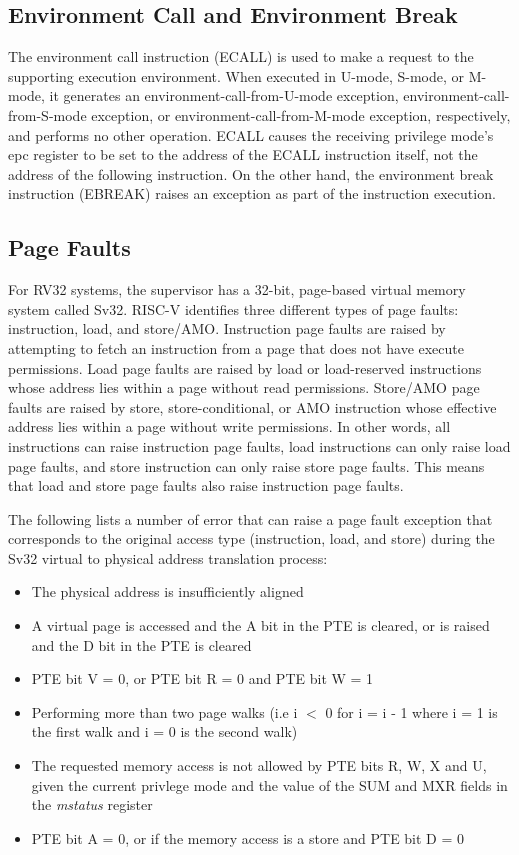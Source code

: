\documentclass[12pt]{article}
\begin{document}
\subsection{Environment Call and Environment Break}
The environment call instruction (ECALL) is used to make a request to the supporting execution environment. When executed in U-mode, S-mode, or M-mode, it generates an environment-call-from-U-mode exception, environment-call-from-S-mode exception, or environment-call-from-M-mode exception, respectively, and performs no other operation. ECALL causes the receiving privilege mode’s epc register to be set to the address of the ECALL instruction itself, not the address of the following instruction. On the other hand, the environment break instruction (EBREAK) raises an exception as part of the instruction execution.

\subsection{Page Faults}
For RV32 systems, the supervisor has a 32-bit, page-based virtual memory system called Sv32. RISC-V identifies three different types of page faults: instruction, load, and store/AMO. Instruction page faults are raised by attempting to fetch an instruction from a page that does not have execute permissions. Load page faults are raised by load or load-reserved instructions whose address lies within a page without read permissions. Store/AMO page faults are raised by store, store-conditional, or AMO instruction whose effective address lies within a page without write permissions. In other words, all instructions can raise instruction page faults, load instructions can only raise load page faults, and store instruction can only raise store page faults. This means that load and store page faults also raise instruction page faults. 

The following lists a number of error that can raise a page fault exception that corresponds to the original access type (instruction, load, and store) during the Sv32 virtual to physical address translation process:
\begin{itemize}
    \item The physical address is insufficiently aligned
    \item A virtual page is accessed and the A bit in the PTE is cleared, or is raised and the D bit in the PTE is cleared
    \item PTE bit V = 0, or PTE bit R = 0 and PTE bit W = 1
    \item Performing more than two page walks (i.e i $<$ 0 for i = i - 1 where i = 1 is the first walk and i = 0 is the second walk)
    \item The requested memory access is not allowed by PTE bits R, W, X and U, given the current privlege mode and the value of the SUM and MXR fields in the \emph{mstatus} register
    \item PTE bit A = 0, or if the memory access is a store and PTE bit D = 0
\end{itemize}
\end{document}
